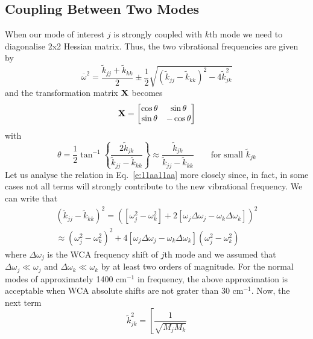\documentclass[a4paper,titlepage,twoside,fleqn,12pt]{book}
\begin{document}
\begin{refsection}
\subsection{Coupling Between Two Modes\label{s:coupling-between-2-modes}}

When our mode of interest $j$ is strongly coupled
with $k$th mode we need to diagonalise 2x2 Hessian matrix.
Thus, the two vibrational frequencies are given by
%
\begin{equation} \label{e:11aa11aa}
 \overline{\omega}^2 = %
\frac{ \tilde{k}_{jj} + \tilde{k}_{kk} }{2}
\pm \frac{1}{2}
\sqrt{\left( \tilde{k}_{jj} - \tilde{k}_{kk}\right)^2 - 4\tilde{k}_{jk}^2}
\end{equation}
%
and the transformation matrix $\bf X$ becomes
%
\begin{equation} \label{e:ohoho}
 {\bf X} = 
\begin{bmatrix}
\cos{\theta} &   \sin{\theta}\\ 
\sin{\theta} &  -\cos{\theta}
\end{bmatrix}
\end{equation}
%
with
%
\begin{equation}
\theta = \frac{1}{2} \tan^{-1}\left\{\frac{2\tilde{k}_{jk}}{\tilde{k}_{jj} - \tilde{k}_{kk}}\right\} 
 \approx \frac{\tilde{k}_{jk}}{\tilde{k}_{jj} - \tilde{k}_{kk}} \qquad\text{for small $\tilde{k}_{jk}$}
\end{equation}
%
Let us analyse the relation in Eq.~\eqref{e:11aa11aa} more closely
since, in fact, in some cases not all terms will strongly contribute to the new vibrational
frequency. We can write that
%
\begin{multline}
 \left( \tilde{k}_{jj} - \tilde{k}_{kk}\right)^2 = 
 \left( \left[ \omega_j^2 - \omega_k^2 \right] 
 +
 2\left[ \omega_j\Delta\omega_j - \omega_k\Delta\omega_k \right]\right)^2 \\
 \approx \left( \omega_j^2 - \omega_k^2 \right)^2
 + 4 \left[ \omega_j\Delta\omega_j - \omega_k\Delta\omega_k \right] \left( \omega_j^2 - \omega_k^2 \right)
\end{multline}
%
where $\Delta\omega_j$ is the WCA frequency shift of $j$th mode
and we assumed that $\Delta\omega_j\ll\omega_j$ and $\Delta\omega_k\ll\omega_k$
by at least two orders of magnitude. For the
normal modes of approximately 1400 cm$^{-1}$
in frequency, the above approximation is acceptable
when WCA absolute shifts are not grater than 30 cm$^{-1}$.
Now, the next term
%
\begin{equation}
 \tilde{k}_{jk}^2 = \left[ \frac{1}{\sqrt{M_jM_k}}

\end{equation}
\end{refsection}
\end{document}
